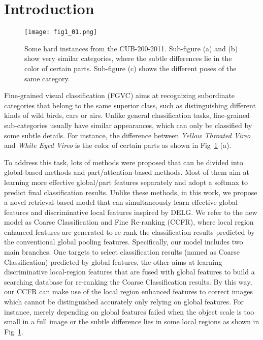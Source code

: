 \documentclass[10pt,twocolumn,letterpaper]{article}
\begin{document}
\section{Introduction}
\begin{figure}[t]
\begin{center}
\texttt{[image: fig1\_01.png]}
\end{center}
   \caption{Some hard instances from the CUB-200-2011\cite{wah2011caltech}. Sub-figure (a) and (b) show very similar categories, where the subtle differences lie in the color of certain parts. Sub-figure (c) shows the different poses of the same category.}
\label{fig1}
\end{figure}
Fine-grained visual classification (FGVC) aims at recognizing subordinate categories that belong to the same superior class, such as distinguishing different kinds of wild birds\cite{wah2011caltech}, cars\cite{krause20133d} or airs\cite{maji2013fine}. Unlike general classification tasks, fine-grained sub-categories usually have similar appearances, which can only be classified by some subtle details. For instance, the difference between \textit{Yellow Throated Vireo} and \textit{White Eyed Vireo} is the color of certain parts as shown in Fig~\ref{fig1} (a). 

To address this task, lots of methods were proposed that can be divided into global-based methods\cite{li2017dynamic,cui2018large, SimonRDD20} and part/attention-based methods\cite{YangLWHGW18,GeLY19,korsch2019classification,du2020fine,abs-2004-02684,ZhuangW020}. 
Most of them aim at learning more effective global/part features separately and adopt a softmax to predict final classification results. Unlike these methods, in this work, we propose a novel retrieval-based model that can simultaneously learn effective global features and discriminative local features inspired by DELG\cite{DBLP:journals/corr/abs-2001-05027}. We refer to the new model as Coarse Classification and Fine Re-ranking (CCFR), where local region enhanced features are generated to re-rank the classification results predicted by the conventional global pooling features. Specifically, our model includes two main branches. One targets to select  classification results (named as Coarse Classification) predicted by global features, the other aims at learning discriminative local-region features that are fused with global features to build a searching database for re-ranking the Coarse Classification results. By this way, our CCFR can make use of the local region enhanced features to correct images which cannot be distinguished accurately only relying on global features. For instance, merely depending on global features failed when the object scale is too small in a full image or the subtle difference lies in some local regions as shown in Fig~\ref{fig1}. 
\end{document}
